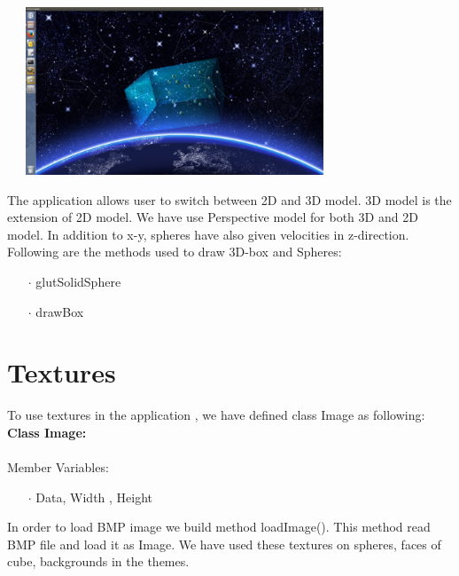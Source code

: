 \documentclass[a4paper,12pt]{report}
\begin{document}
\begin{center}
\includegraphics[height=5cm,width=10cm]{3d.png}\\
\end{center}
The application allows user to switch between 2D and 3D model. 3D model 
is the extension of 2D model. We have use Perspective model for both 3D and 2D model. In addition to x-y, spheres have also given velocities in z-direction. Following are the methods used to draw 3D-box and Spheres:
\begin{itemize}
\item[$\cdot$] glutSolidSphere
\item[$\cdot$] drawBox
\end{itemize}

\section{Textures}

To use textures in the application , we have defined class Image as following:
\textbf{Class Image:}\\\\
\hspace*{5mm}Member Variables:
\begin{itemize}
\item[$\cdot$] Data, Width , Height
\end{itemize}
In order to load BMP image we build method loadImage(). This method read BMP file and load it as Image. We have used these textures on spheres, faces of cube, backgrounds in the themes.
\end{document}
